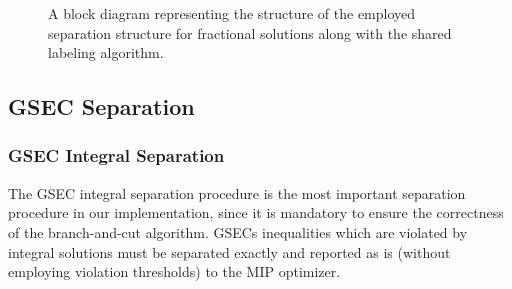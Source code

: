 \begin{figure}[ht]
	\centering
	\caption{A block diagram representing the structure
		of the employed separation structure for fractional solutions
		along with the shared labeling algorithm.
	}
	\label{fig:fractional-separation-block-diagram}
\end{figure}

\subsection{GSEC Separation}
\label{sec:impl-gsec-separation}

\subsubsection{GSEC Integral Separation}
\label{sec:impl-gsec-integral-separation}

The GSEC integral separation procedure is the most important
separation procedure in our implementation,
since it is mandatory to ensure the correctness of the branch-and-cut algorithm.
GSECs inequalities which are violated by integral solutions
must be separated exactly and reported as is
(without employing violation thresholds) to the MIP optimizer.

